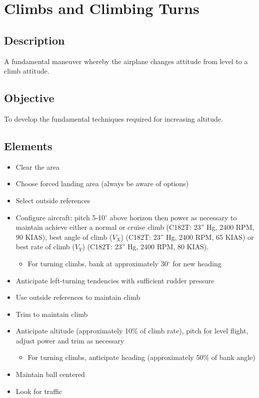 \section{Climbs and Climbing Turns}

\subsection{Description}

A fundamental maneuver whereby the airplane changes attitude from level to a
climb attitude.

\subsection{Objective}

To develop the fundamental techniques required for increasing altitude.

\subsection{Elements}

\begin{itemize}
  \item Clear the area
  \item Choose forced landing area (always be aware of options)
  \item Select outside references
  \item Configure aircraft: pitch 5-10$^\circ$ above horizon then power as necessary
    to maintain achieve either a normal or cruise climb (C182T: 23'' Hg, 2400
    RPM, 90 KIAS), best angle of climb ($V_X$) (C182T: 23'' Hg, 2400 RPM, 65
    KIAS) or best rate of climb ($V_Y$) (C182T: 23'' Hg, 2400 RPM, 80 KIAS).
    \begin{itemize}
      \item For turning climbs, bank at approximately 30$^\circ$ for new
        heading
    \end{itemize}
  \item Anticipate left-turning tendencies with sufficient rudder pressure
  \item Use outside references to maintain climb
  \item Trim to maintain climb
  \item Anticipate altitude (approximately 10\% of climb rate), pitch for level
    flight, adjust power and trim as necessary
    \begin{itemize}
      \item For turning climbs, anticipate heading (approximately 50\% of bank
        angle)
    \end{itemize}
  \item Maintain ball centered
  \item Look for traffic
\end{itemize}

